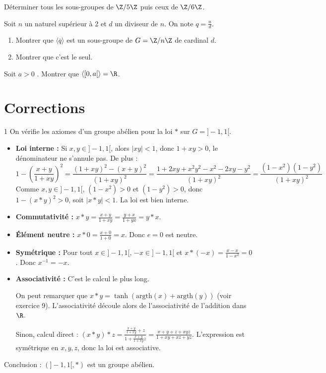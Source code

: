 \begin{exercice}
    Déterminer tous les sous-groupes de $\Z/5\Z$ puis ceux de $\Z/6\Z$.
\end{exercice}

\begin{exercice}
    Soit $n$ un naturel supérieur à 2 et $d$ un diviseur de $n$. On note $q=\frac{n}{d}$.
    \begin{enumerate}
        \item Montrer que $\langle \overline{q} \rangle$ est un sous-groupe de $G=\Z/n\Z$ de cardinal $d$.
        \item Montrer que c'est le seul.
    \end{enumerate}
\end{exercice}

\begin{exercice}
    Soit $a>0$ . Montrer que $\langle [0,a[ \rangle =\R$.
\end{exercice}

\newpage
\section{Corrections}

\begin{correction}{1}
    On vérifie les axiomes d'un groupe abélien pour la loi $\ast$ sur $G=]-1,1[$.
    \begin{itemize}
        \item \textbf{Loi interne :} Si $x,y \in ]-1,1[$, alors $|xy| < 1$, donc $1+xy > 0$, le dénominateur ne s'annule pas. De plus :
            \[1 - \left(\frac{x+y}{1+xy}\right)^2 = \frac{(1+xy)^2 - (x+y)^2}{(1+xy)^2} = \frac{1+2xy+x^2y^2 - x^2-2xy-y^2}{(1+xy)^2} = \frac{(1-x^2)(1-y^2)}{(1+xy)^2}\]
            Comme $x,y \in ]-1,1[$, $(1-x^2) > 0$ et $(1-y^2) > 0$, donc $1 - (x \ast y)^2 > 0$, soit $|x \ast y| < 1$. La loi est bien interne.
        \item \textbf{Commutativité :} $x \ast y = \frac{x+y}{1+xy} = \frac{y+x}{1+yx} = y \ast x$.
        \item \textbf{Élément neutre :} $x \ast 0 = \frac{x+0}{1+0} = x$. Donc $e=0$ est neutre.
        \item \textbf{Symétrique :} Pour tout $x \in ]-1,1[$, $-x \in ]-1,1[$ et $x \ast (-x) = \frac{x-x}{1-x^2} = 0$. Donc $x^{-1} = -x$.
        \item \textbf{Associativité :} C'est le calcul le plus long.

        On peut remarquer que $x \ast y = \tanh(\text{argth}(x) + \text{argth}(y))$ (voir exercice 9). 
        L'associativité découle alors de l'associativité de l'addition dans $\R$.
        
        Sinon, calcul direct :
        $(x \ast y) \ast z = \frac{\frac{x+y}{1+xy} + z}{1 + \frac{x+y}{1+xy}z} = \frac{x+y+z+xyz}{1+xy+xz+yz}$.
        L'expression est symétrique en $x,y,z$, donc la loi est associative.
    \end{itemize}
    Conclusion : $(]-1,1[, \ast)$ est un groupe abélien.
\end{correction}

